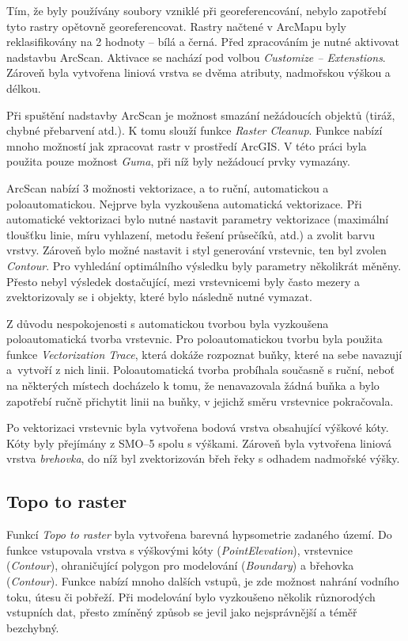 \documentclass[thesis=M,czech]{FITthesis}[2012/06/26]
\begin{document}
Tím, že byly používány soubory vzniklé při georeferencování, nebylo zapotřebí tyto rastry opětovně georeferencovat. Rastry načtené v ArcMapu byly reklasifikovány na 2 hodnoty – bílá a černá. Před zpracováním je nutné aktivovat nadstavbu ArcScan. Aktivace se nachází pod volbou \textit{Customize – Extenstions}. Zároveň byla vytvořena liniová vrstva se dvěma atributy, nadmořskou výškou a délkou. 


Při spuštění nadstavby ArcScan je možnost smazání nežádoucích objektů (tiráž, chybné přebarvení atd.). K tomu slouží funkce \textit{Raster Cleanup}. Funkce nabízí mnoho možností jak zpracovat rastr v prostředí ArcGIS. V této práci byla použita pouze možnost \textit{Guma}, při níž byly nežádoucí prvky vymazány. 

ArcScan nabízí 3 možnosti vektorizace, a to ruční, automatickou a poloautomatickou. Nejprve byla vyzkoušena automatická vektorizace. Při automatické vektorizaci bylo nutné nastavit parametry vektorizace (maximální tloušťku linie, míru vyhlazení, metodu řešení průsečíků, atd.) a zvolit barvu vrstvy. Zároveň bylo možné nastavit i styl generování vrstevnic, ten byl zvolen \textit{Contour}. Pro vyhledání optimálního výsledku byly parametry několikrát měněny. Přesto nebyl výsledek dostačující, mezi vrstevnicemi byly často mezery a zvektorizovaly se i objekty, které bylo následně nutné vymazat. 

Z důvodu nespokojenosti s automatickou tvorbou byla vyzkoušena poloautomatická tvorba vrstevnic. Pro poloautomatickou tvorbu byla použita funkce \textit{Vectorization Trace}, která dokáže rozpoznat buňky, které na sebe navazují a~vytvoří z nich linii. Poloautomatická tvorba probíhala současně s ruční, neboť na některých místech docházelo k tomu, že nenavazovala žádná buňka a bylo zapotřebí ručně přichytit linii na buňky, v jejichž směru vrstevnice pokračovala.

Po vektorizaci vrstevnic byla vytvořena bodová vrstva obsahující výškové kóty. Kóty byly přejímány z SMO–5 spolu s výškami. Zároveň byla vytvořena liniová vrstva \textit{brehovka}, do níž byl zvektorizován břeh řeky s odhadem nadmořské výšky.



\subsection{Topo to raster}
Funkcí \textit{Topo to raster} byla vytvořena barevná hypsometrie zadaného území. Do funkce vstupovala vrstva s výškovými kóty (\textit{PointElevation}), vrstevnice (\textit{Contour}), ohraničující polygon pro modelování (\textit{Boundary}) a břehovka (\textit{Contour}). Funkce nabízí mnoho dalších vstupů, je zde možnost nahrání vodního toku, útesu či pobřeží. Při modelování bylo vyzkoušeno několik různorodých vstupních dat, přesto zmíněný způsob se jevil jako nejsprávnější a téměř bezchybný. 
\end{document}
